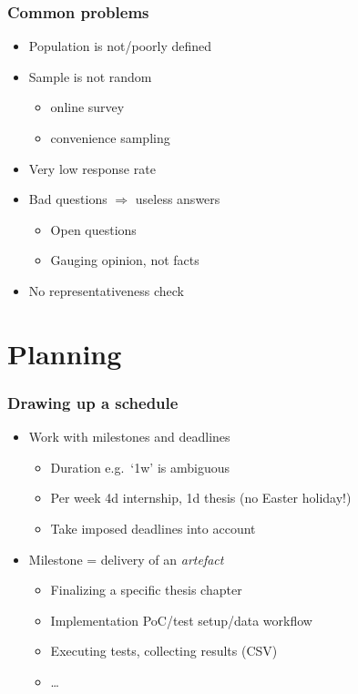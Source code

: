 \documentclass[aspectratio=169]{beamer}
\begin{document}
\begin{frame}
  \frametitle{Common problems}

  \begin{itemize}
    \item Population is not/poorly defined
    \item Sample is not random
          \begin{itemize}
            \item online survey
            \item convenience sampling
          \end{itemize}
    \item Very low response rate
    \item Bad questions $\Rightarrow$ useless answers
          \begin{itemize}
            \item Open questions
            \item Gauging opinion, not facts
          \end{itemize}
    \item No representativeness check
  \end{itemize}

\end{frame}

\section{Planning}

\begin{frame}
  \frametitle{Drawing up a schedule}

  \begin{itemize}
    \item Work with milestones and deadlines
    \begin{itemize}
      \item Duration e.g.\ `1w' is ambiguous
      \item Per week 4d internship, 1d thesis (no Easter holiday!)
      \item Take imposed deadlines into account
    \end{itemize}
    \item Milestone = delivery of an \textit{artefact}
    \begin{itemize}
      \item Finalizing a specific thesis chapter
      \item Implementation PoC/test setup/data workflow
      \item Executing tests, collecting results (CSV)
      \item \ldots
    \end{itemize}
  \end{itemize}

\end{frame}
\end{document}
